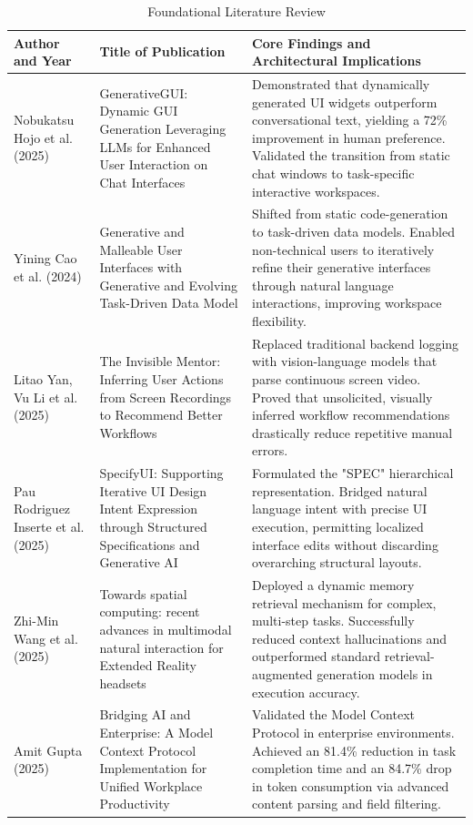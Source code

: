 \documentclass[12pt, a4paper]{report}
\begin{document}
\begin{table}[H]
    \centering
    \scriptsize
    \caption{Foundational Literature Review}
    \label{tab:literature}
    \begin{tabularx}{\textwidth}{>{\raggedright\arraybackslash}X >{\raggedright\arraybackslash}X >{\raggedright\arraybackslash}X}
    \toprule
    \textbf{Author and Year} & \textbf{Title of Publication} & \textbf{Core Findings and Architectural Implications} \\
    \midrule
    Nobukatsu Hojo et al. (2025) & GenerativeGUI: Dynamic GUI Generation Leveraging LLMs for Enhanced User Interaction on Chat Interfaces & Demonstrated that dynamically generated UI widgets outperform conversational text, yielding a 72\% improvement in human preference. Validated the transition from static chat windows to task-specific interactive workspaces. \\
    \midrule
    Yining Cao et al. (2024) & Generative and Malleable User Interfaces with Generative and Evolving Task-Driven Data Model & Shifted from static code-generation to task-driven data models. Enabled non-technical users to iteratively refine their generative interfaces through natural language interactions, improving workspace flexibility. \\
    \midrule
    Litao Yan, Vu Li et al. (2025) & The Invisible Mentor: Inferring User Actions from Screen Recordings to Recommend Better Workflows & Replaced traditional backend logging with vision-language models that parse continuous screen video. Proved that unsolicited, visually inferred workflow recommendations drastically reduce repetitive manual errors. \\
    \midrule
    Pau Rodriguez Inserte et al. (2025) & SpecifyUI: Supporting Iterative UI Design Intent Expression through Structured Specifications and Generative AI & Formulated the "SPEC" hierarchical representation. Bridged natural language intent with precise UI execution, permitting localized interface edits without discarding overarching structural layouts. \\
    \midrule
    Zhi-Min Wang et al. (2025) & Towards spatial computing: recent advances in multimodal natural interaction for Extended Reality headsets & Deployed a dynamic memory retrieval mechanism for complex, multi-step tasks. Successfully reduced context hallucinations and outperformed standard retrieval-augmented generation models in execution accuracy. \\
    \midrule
    Amit Gupta (2025) & Bridging AI and Enterprise: A Model Context Protocol Implementation for Unified Workplace Productivity & Validated the Model Context Protocol in enterprise environments. Achieved an 81.4\% reduction in task completion time and an 84.7\% drop in token consumption via advanced content parsing and field filtering. \\

\end{tabularx}
\end{table}
\end{document}

